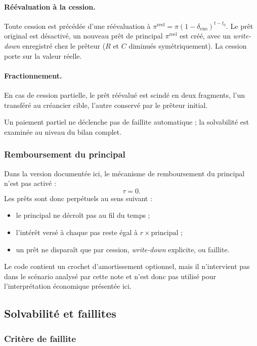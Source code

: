 \documentclass[10pt,a4paper]{article}
\begin{document}
\paragraph{Réévaluation à la cession.} Toute cession est précédée d'une réévaluation à \(\pi^{\mathrm{reel}}=\pi(1-\delta_{\mathrm{exo}})^{t-t_0}\). Le prêt original est désactivé, un nouveau prêt de principal \(\pi^{\mathrm{reel}}\) est créé, avec un \textit{write-down} enregistré chez le prêteur (\(R\) et \(C\) diminués symétriquement). La cession porte sur la valeur réelle.

\paragraph{Fractionnement.} En cas de cession partielle, le prêt réévalué est scindé en deux fragments, l'un transféré au créancier cible, l'autre conservé par le prêteur initial.

Un paiement partiel ne déclenche pas de faillite automatique ; la solvabilité est examinée au niveau du bilan complet.

\subsubsection{Remboursement du principal}

Dans la version documentée ici, le mécanisme de remboursement du principal n'est pas activé :
\[
\tau = 0.
\]
Les prêts sont donc perpétuels au sens suivant :
\begin{itemize}
\item le principal ne décroît pas au fil du temps ;
\item l'intérêt versé à chaque pas reste égal à \(r \times \text{principal}\) ;
\item un prêt ne disparaît que par cession, \textit{write-down} explicite, ou faillite.
\end{itemize}
Le code contient un crochet d'amortissement optionnel, mais il n'intervient pas dans le scénario analysé par cette note et n'est donc pas utilisé pour l'interprétation économique présentée ici.

\subsection{Solvabilité et faillites}

\subsubsection{Critère de faillite}
\end{document}
